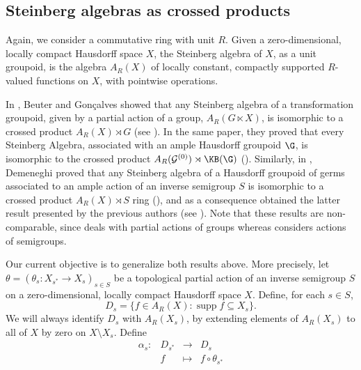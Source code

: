 %
%

\subsection{Steinberg algebras as crossed products}\label{sectiondualpartialaction}

Again, we consider a commutative ring with unit $R$. Given a zero-dimensional, locally compact Hausdorff space $X$, the Steinberg algebra of $X$, as a unit groupoid, is the algebra $A_R(X)$ of locally constant, compactly supported $R$-valued functions on $X$, with pointwise operations.

In \cite{MR3743184}, Beuter and Gonçalves showed that any Steinberg algebra of a transformation groupoid, given by a partial action of a group, $A_R(G\ltimes X)$, is isomorphic to a crossed product $A_R(X)\rtimes G$ (see \cite[Theorem~3.2]{MR3743184}). In the same paper, they proved that every Steinberg Algebra, associated with an ample Hausdorff groupoid $\G$, is isomorphic to the crossed product $A_R(\mathcal{G}^{(0)})\rtimes\KB(\G)$ (\cite[Theorem~5.2]{MR3743184}). Similarly, in \cite{arxiv1710.09723v1}, Demeneghi proved that any Steinberg algebra of a Hausdorff groupoid of germs associated to an ample action of an inverse semigroup $S$ is isomorphic to a crossed product $A_R(X)\rtimes S$ ring (\cite[Theorem~2.3.6]{arxiv1710.09723v1}), and as a consequence obtained the latter result presented by the previous authors (see \cite[Proposition~2.4.3]{arxiv1710.09723v1}). Note that these results are non-comparable, since \cite{MR3743184} deals with partial actions of groups whereas \cite{arxiv1710.09723v1} considers actions of semigroups.

Our current objective is to generalize both results above. More precisely, let $\theta=\left(\theta_s:X_{s^*}\to X_s\right)_{s\in S}$ be a topological partial action of an inverse semigroup $S$ on a zero-dimensional, locally compact Hausdorff space $X$. Define, for each $s \in S$,
\[D_s=\{f \in A_R(X):\operatorname{supp}f\subseteq X_s \}.\]
We will always identify $D_s$ with $A_R(X_s)$, by extending elements of $A_R(X_s)$ to all of $X$ by zero on $X\setminus X_s$. Define
\[\begin{array}{rrcl}
 \alpha_s:& D_{s^*} &\to          &D_s\\
                 &f              & \mapsto &f \circ \theta_{s^*}
\end{array}\]

